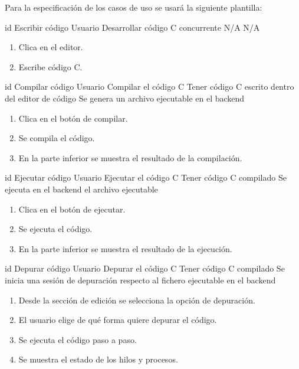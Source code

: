 
Para la especificación de los casos de uso se usará la siguiente plantilla:

\printuctemplate{}

\begin{useCase}{id}
    {Escribir código} %
    {Usuario} %
    {Desarrollar código C concurrente}  %
    {N/A}  %
    {N/A} %
    \begin{enumerate} %
        \item Clica en el editor.
        \item Escribe código C.
    \end{enumerate}
\end{useCase}

\begin{useCase}{id}
    {Compilar código}
    {Usuario}
    {Compilar el código C}
    {Tener código C escrito dentro del editor de código}
    {Se genera un archivo ejecutable en el backend}
    \begin{enumerate}
        \item Clica en el botón de compilar.
        \item Se compila el código.
        \item En la parte inferior se muestra el resultado de la compilación.
    \end{enumerate}
\end{useCase}

\begin{useCase}{id}
    {Ejecutar código}
    {Usuario}
    {Ejecutar el código C}
    {Tener código C compilado}
    {Se ejecuta en el backend el archivo ejecutable}
    \begin{enumerate}
        \item Clica en el botón de ejecutar.
        \item Se ejecuta el código.
        \item En la parte inferior se muestra el resultado de la ejecución.
    \end{enumerate}
\end{useCase}

\begin{useCase}{id}
    {Depurar código}
    {Usuario}
    {Depurar el código C}
    {Tener código C compilado}
    {Se inicia una sesión de depuración respecto al fichero ejecutable en el backend}
    \begin{enumerate}
        \item Desde la sección de edición se selecciona la opción de depuración.
        \item El usuario elige de qué forma quiere \gls{depurar} el código.
        \item Se ejecuta el código paso a paso.
        \item Se muestra el estado de los \glspl{hilo} y procesos.
    \end{enumerate}
\end{useCase}

